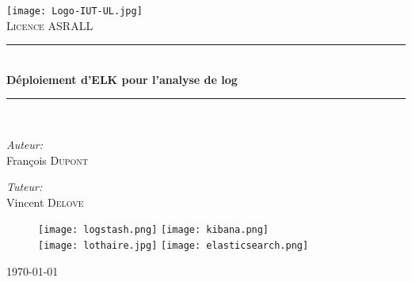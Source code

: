 \begin{titlepage}
\begin{center}
 \newcommand{\HRule}{\rule{\linewidth}{0.5mm}}

\texttt{[image: Logo-IUT-UL.jpg]}\\[1cm]


\textsc{\LARGE Licence ASRALL}\\[0.5cm]

\HRule \\[0.4cm]
{ \huge \bfseries Déploiement d'ELK pour l'analyse de log\\[0.4cm] }

\HRule \\[1.5cm]

\noindent
\begin{minipage}{0.5\textwidth}
\begin{flushleft} \large
\emph{Auteur:}\\
François \textsc{Dupont}\\
\end{flushleft}
\end{minipage}%
\begin{minipage}{0.5\textwidth}
\begin{flushright} \large
\emph{Tuteur:} \\
Vincent \textsc{Delove}
\end{flushright}
\end{minipage}

%

\vfill

\begin{figure}[h]
    \centering
    \texttt{[image: logstash.png]}
    \hfill
    \texttt{[image: kibana.png]}
    \\[0.2cm]
    \texttt{[image: lothaire.jpg]}
    \hfill
    \texttt{[image: elasticsearch.png]}
\end{figure}

\vfill
{\Large \today}%

\end{center}
\end{titlepage}
